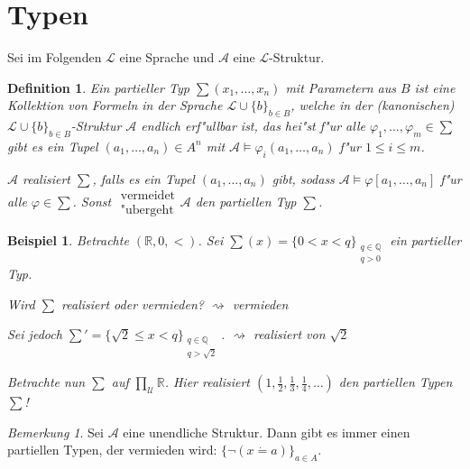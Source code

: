 \documentclass[a4paper,12pt,numbers=noenddot,parskip=full]{scrartcl}
\newcommand{\setQ}{\mathbb{Q}}
\newcommand{\setR}{\mathbb{R}}
\newcommand{\scrL}{\mathcal{L}}
\newcommand{\scrA}{\mathcal{A}}
\newcommand{\scrU}{\mathcal{U}}
\theoremstyle{dotless}
\newtheorem{definition}[theorem]{Definition}
\newtheorem{example}[theorem]{Beispiel}
\theoremstyle{remark}
\newtheorem*{remark}{Bemerkung}
\begin{document}
\section{Typen}
Sei im Folgenden $\scrL$ eine Sprache und $\scrA$ eine $\scrL$-Struktur.
\begin{definition}
	Ein partieller Typ $\sum (x_1, \dots, x_n)$ mit Parametern aus $B$ ist eine Kollektion von Formeln in der Sprache $\scrL \cup \{b\}_{b \in B}$, welche in der (kanonischen) $\scrL \cup \{b\}_{b \in B}$-Struktur $\scrA$ endlich erf"ullbar ist, das hei"st f"ur alle $\varphi_1, \dots, \varphi_m \in \sum$ gibt es ein Tupel $(a_1, \dots, a_n) \in A^n$ mit $\scrA \models \varphi_i(a_1, \dots, a_n)$ f"ur $1 \leq i \leq m$.
	
	$\scrA$ realisiert $\sum$, falls es ein Tupel $(a_1, \dots, a_n)$ gibt, sodass $\scrA \models \varphi[a_1, \dots, a_n]$ f"ur alle $\varphi \in \sum$. Sonst $\begin{array}{c}
		\text{vermeidet}\\ 
		\text{"ubergeht}
	\end{array} \scrA$ den partiellen Typ $\sum$. 
\end{definition}
\begin{example}
	Betrachte $(\setR, 0, <)$. Sei $\sum (x) = \{0 < x<q \}_{\substack{q \in \setQ \\ q>0}}$ ein partieller Typ.
	
	Wird $\sum$ realisiert oder vermieden? $\rightsquigarrow$ vermieden
	
	Sei jedoch $\sum' = \{\sqrt{2} \leq x < q \}_{\substack{q \in \setQ \\ q > \sqrt{2}}}$. $\rightsquigarrow$ realisiert von $\sqrt{2}$
	
	Betrachte nun $\sum$ auf $\prod\limits_{\scrU} \setR$. Hier realisiert $(1, \frac{1}{2}, \frac{1}{3}, \frac{1}{4}, \dots)$ den partiellen Typen $\sum$!
\end{example}
\begin{remark}
	Sei $\scrA$ eine unendliche Struktur. Dann gibt es immer einen partiellen Typen, der vermieden wird: $\{\lnot (x \dot= a) \}_{a \in A}$.
\end{remark}
\end{document}
